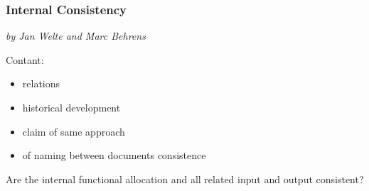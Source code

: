 \subsubsection{Internal Consistency}

\textit{by Jan Welte and Marc Behrens}

Contant:
\begin{itemize}
\item relations
\item historical development
\item claim of same approach
\item of naming between documents consistence 
\end{itemize}

Are the internal functional allocation and all related input and output consistent?
